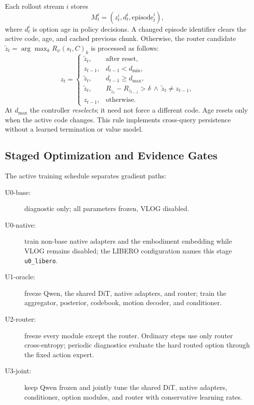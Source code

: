 Each rollout stream \(i\) stores
\begin{equation}
    M_t^i=(z_t^i,d_t^i,\mathrm{episode}_t^i),
    \label{eq:controller-state}
\end{equation}
where \(d_t^i\) is option age in policy decisions.  A changed episode identifier
clears the active code, age, and cached previous chunk.  Otherwise, the router
candidate \(\tilde z_t=\arg\max_k R_\psi(s_t,C)_k\) is processed as follows:
\begin{equation}
z_t=
\begin{cases}
\tilde z_t, & \text{after reset},\\
z_{t-1}, & d_{t-1}<d_{\min},\\
\tilde z_t, & d_{t-1}\ge d_{\max},\\
\tilde z_t, &
R_{\tilde z_t}-R_{z_{t-1}}>\delta
\ \land\ \tilde z_t\ne z_{t-1},\\
z_{t-1}, & \text{otherwise}.
\end{cases}
\label{eq:controller-rule}
\end{equation}
At \(d_{\max}\) the controller \emph{reselects}; it need not force a different
code.  Age resets only when the active code changes.  This rule implements
cross-query persistence without a learned termination or value model.



\subsection{Staged Optimization and Evidence Gates}

The active training schedule separates gradient paths:
\begin{description}
    \item[U0-base:] diagnostic only; all parameters frozen, VLOG disabled.
    \item[U0-native:] train non-base native adapters and the embodiment
    embedding while VLOG remains disabled; the LIBERO configuration names this
    stage \texttt{u0\_libero}.
    \item[U1-oracle:] freeze Qwen, the shared DiT, native adapters, and router;
    train the aggregator, posterior, codebook, motion decoder, and conditioner.
    \item[U2-router:] freeze every module except the router.  Ordinary steps use
    only router cross-entropy; periodic diagnostics evaluate the hard routed
    option through the fixed action expert.
    \item[U3-joint:] keep Qwen frozen and jointly tune the shared DiT, native
    adapters, conditioner, option modules, and router with conservative
    learning rates.
\end{description}

